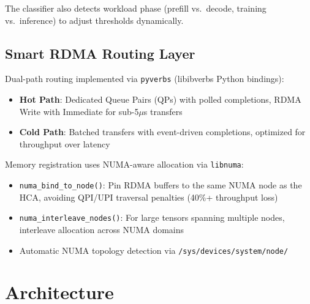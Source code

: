 \documentclass[10pt,letterpaper]{article}
\begin{document}
The classifier also detects workload phase (prefill vs.\ decode, training vs.\ inference) to adjust thresholds dynamically.

\subsection{Smart RDMA Routing Layer}
Dual-path routing implemented via \texttt{pyverbs} (libibverbs Python bindings):

\begin{itemize}[noitemsep]
    \item \textbf{Hot Path}: Dedicated Queue Pairs (QPs) with polled completions, RDMA Write with Immediate for sub-5$\mu$s transfers
    \item \textbf{Cold Path}: Batched transfers with event-driven completions, optimized for throughput over latency
\end{itemize}

Memory registration uses NUMA-aware allocation via \texttt{libnuma}:
\begin{itemize}[noitemsep]
    \item \texttt{numa\_bind\_to\_node()}: Pin RDMA buffers to the same NUMA node as the HCA, avoiding QPI/UPI traversal penalties (40\%+ throughput loss)
    \item \texttt{numa\_interleave\_nodes()}: For large tensors spanning multiple nodes, interleave allocation across NUMA domains
    \item Automatic NUMA topology detection via \texttt{/sys/devices/system/node/}
\end{itemize}

\section{Architecture}
\end{document}
